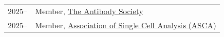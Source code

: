 \begin{longtable}[l]{@{}p{} p{}}

    2025-- & Member, \href{https://www.antibodysociety.org/}{The Antibody Society} \\

    2025-- & Member, \href{https://ascanet.org/}{Association of Single Cell Analysis (ASCA)} \\

\end{longtable}
